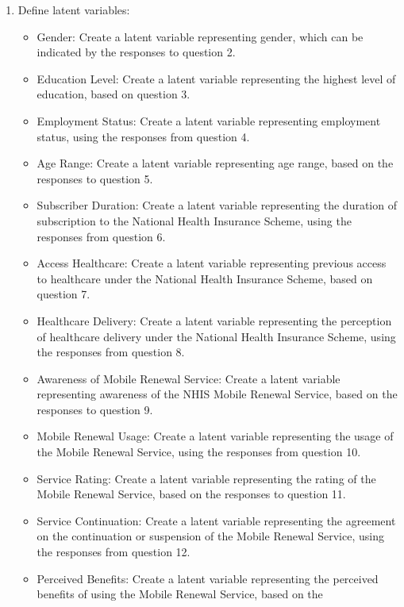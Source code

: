 \documentclass[
]{article}
\begin{document}
\begin{enumerate}
\def\labelenumi{\arabic{enumi}.}
\item
  Define latent variables:

  \begin{itemize}
  \item
    Gender: Create a latent variable representing gender, which can be
    indicated by the responses to question 2.
  \item
    Education Level: Create a latent variable representing the highest
    level of education, based on question 3.
  \item
    Employment Status: Create a latent variable representing employment
    status, using the responses from question 4.
  \item
    Age Range: Create a latent variable representing age range, based on
    the responses to question 5.
  \item
    Subscriber Duration: Create a latent variable representing the
    duration of subscription to the National Health Insurance Scheme,
    using the responses from question 6.
  \item
    Access Healthcare: Create a latent variable representing previous
    access to healthcare under the National Health Insurance Scheme,
    based on question 7.
  \item
    Healthcare Delivery: Create a latent variable representing the
    perception of healthcare delivery under the National Health
    Insurance Scheme, using the responses from question 8.
  \item
    Awareness of Mobile Renewal Service: Create a latent variable
    representing awareness of the NHIS Mobile Renewal Service, based on
    the responses to question 9.
  \item
    Mobile Renewal Usage: Create a latent variable representing the
    usage of the Mobile Renewal Service, using the responses from
    question 10.
  \item
    Service Rating: Create a latent variable representing the rating of
    the Mobile Renewal Service, based on the responses to question 11.
  \item
    Service Continuation: Create a latent variable representing the
    agreement on the continuation or suspension of the Mobile Renewal
    Service, using the responses from question 12.
  \item
    Perceived Benefits: Create a latent variable representing the
    perceived benefits of using the Mobile Renewal Service, based on the

\end{itemize}
\end{enumerate}
\end{document}

